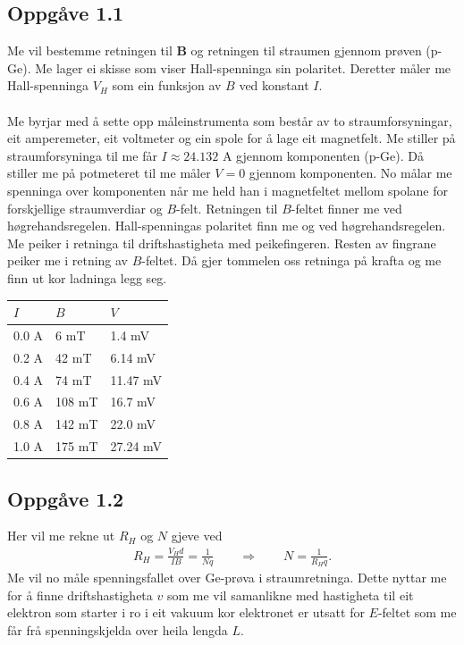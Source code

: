 \documentclass[11pt, a4paper]{article}
\newcommand{\vb}{\mathbf}
\begin{document}
  \subsection*{Oppgåve 1.1}
    Me vil bestemme retningen til $\vb{B}$ og retningen til straumen gjennom prøven (p-Ge). Me lager ei skisse som viser Hall-spenninga sin polaritet.
    Deretter måler me Hall-spenninga $V_{H}$ som ein funksjon av $B$ ved konstant $I$. \\ \\
    Me byrjar med å sette opp måleinstrumenta som består av to straumforsyningar, eit amperemeter, eit voltmeter og ein spole for å lage eit magnetfelt.
    Me stiller på straumforsyninga til me får $I \approx 24.132$ A gjennom komponenten (p-Ge). Då stiller me på potmeteret til me måler $V = 0$ gjennom komponenten.
    No målar me spenninga over komponenten når me held han i magnetfeltet mellom spolane for forskjellige straumverdiar og $B$-felt. Retningen til $B$-feltet finner me ved 
    høgrehandsregelen. %
    Hall-spenningas polaritet finn me og ved høgrehandsregelen. Me peiker i retninga til driftshastigheta med peikefingeren. Resten av fingrane peiker me i retning av $B$-feltet.
    Då gjer tommelen oss retninga på krafta og me finn ut kor ladninga legg seg. %
    \begin{center}
      \begin{tabular}{|l|l||l|}
        \hline
        $I$ & $B$ & $V$ \\
        \hline
        0.0 A & 6 mT & 1.4 mV \\
        0.2 A & 42 mT & 6.14 mV \\
        0.4 A & 74 mT & 11.47 mV \\
        0.6 A & 108 mT & 16.7 mV \\
        0.8 A & 142 mT & 22.0 mV \\
        1.0 A & 175 mT & 27.24 mV \\
        \hline
      \end{tabular}
    \end{center}

  \subsection*{Oppgåve 1.2}
    Her vil me rekne ut $R_{H}$ og $N$ gjeve ved
    \begin{align*}
      R_{H} = \frac{V_{H}d}{IB} = \frac{1}{Nq} \qquad \Rightarrow \qquad N = \frac{1}{R_{H}q}.
    \end{align*}
    Me vil no måle spenningsfallet over Ge-prøva i straumretninga. Dette nyttar me for å finne driftshastigheta $v$ som me vil samanlikne med hastigheta til eit elektron som 
    starter i ro i eit vakuum kor elektronet er utsatt for $E$-feltet som me får frå spenningskjelda over heila lengda $L$. \\ \\
    
\end{document}
